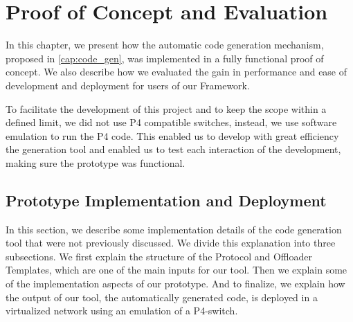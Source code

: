 \chapter{Proof of Concept and Evaluation}
\label{cap:evaluation}


In this chapter, we present how the automatic code generation mechanism, proposed in \autoref{cap:code_gen}, was implemented in a fully functional proof of concept. We also describe how we evaluated the gain in performance and ease of development and deployment for users of our Framework.

To facilitate the development of this project and to keep the scope within a defined limit, we did not use P4 compatible switches, instead, we use software emulation to run the P4 code. This enabled us to develop with great efficiency the generation tool and enabled us to test each interaction of the development, making sure the prototype was functional.



\section{Prototype Implementation and Deployment}
\label{sec:evaluation:implementation}






In this section, we describe some implementation details of the code generation tool that were not previously discussed. We divide this explanation into three subsections. We first explain the structure of the Protocol and Offloader Templates, which are one of the main inputs for our tool. Then we explain some of the implementation aspects of our prototype. And to finalize, we explain how the output of our tool, the automatically generated code, is deployed in a virtualized network using an emulation of a P4-switch.


